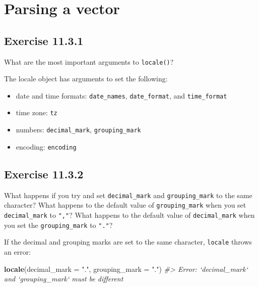 \documentclass[]{book}
\newenvironment{Shaded}{\begin{snugshade}}{\end{snugshade}}
\newcommand{\CommentTok}[1]{\textcolor[rgb]{0.56,0.35,0.01}{\textit{#1}}}
\newcommand{\DataTypeTok}[1]{\textcolor[rgb]{0.13,0.29,0.53}{#1}}
\newcommand{\KeywordTok}[1]{\textcolor[rgb]{0.13,0.29,0.53}{\textbf{#1}}}
\newcommand{\NormalTok}[1]{#1}
\newcommand{\StringTok}[1]{\textcolor[rgb]{0.31,0.60,0.02}{#1}}
\providecommand{\tightlist}{%
  \setlength{\itemsep}{0pt}\setlength{\parskip}{0pt}}
\theoremstyle{plain}
\theoremstyle{remark}
\begin{document}
\hypertarget{parsing-a-vector}{%
\section{Parsing a vector}\label{parsing-a-vector}}

\hypertarget{exercise-11.3.1}{%
\subsection*{\texorpdfstring{Exercise
{11.3.1}}{Exercise 11.3.1}}\label{exercise-11.3.1}}

What are the most important arguments to \texttt{locale()}?

The locale object has arguments to set the following:

\begin{itemize}
\tightlist
\item
  date and time formats: \texttt{date\_names}, \texttt{date\_format},
  and \texttt{time\_format}
\item
  time zone: \texttt{tz}
\item
  numbers: \texttt{decimal\_mark}, \texttt{grouping\_mark}
\item
  encoding: \texttt{encoding}
\end{itemize}

\hypertarget{exercise-11.3.2}{%
\subsection*{\texorpdfstring{Exercise
{11.3.2}}{Exercise 11.3.2}}\label{exercise-11.3.2}}

What happens if you try and set \texttt{decimal\_mark} and
\texttt{grouping\_mark} to the same character? What happens to the
default value of \texttt{grouping\_mark} when you set
\texttt{decimal\_mark} to \texttt{","}? What happens to the default
value of \texttt{decimal\_mark} when you set the \texttt{grouping\_mark}
to \texttt{"."}?

If the decimal and grouping marks are set to the same character,
\texttt{locale} throws an error:

\begin{Shaded}
\begin{Highlighting}[]
\KeywordTok{locale}\NormalTok{(}\DataTypeTok{decimal_mark =} \StringTok{"."}\NormalTok{, }\DataTypeTok{grouping_mark =} \StringTok{"."}\NormalTok{)}
\CommentTok{#> Error: `decimal_mark` and `grouping_mark` must be different}
\end{Highlighting}
\end{Shaded}
\end{document}
